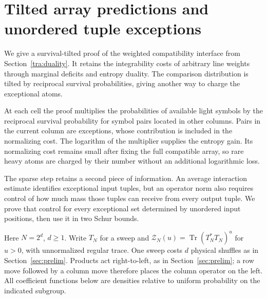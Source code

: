 \section{Tilted array predictions and unordered tuple exceptions}\label{tra:tilted-arrays}

We give a survival-tilted proof of the weighted compatibility interface
from Section~\ref{tra:duality}. It retains the integrability costs of
arbitrary line weights through marginal deficits and entropy duality.
The comparison distribution is tilted by reciprocal survival
probabilities, giving another way to charge the exceptional atoms.

At each cell the proof multiplies the probabilities of available light symbols by the reciprocal survival probability for symbol pairs located in other columns. Pairs in the current column are exceptions, whose contribution is included in the normalizing cost. The logarithm of the multiplier supplies the entropy gain. Its normalizing cost remains small after fixing the full compatible array, so rare heavy atoms are charged by their number without an additional logarithmic loss.

The sparse step retains a second piece of information. An average interaction estimate identifies exceptional input tuples, but an operator norm also requires control of how much mass those tuples can receive from every output tuple. We prove that control for every exceptional set determined by unordered input positions, then use it in two Schur bounds.

Here $N=2^d$, $d\ge1$. Write $T_N$ for a sweep and $\mathcal Z_N(u)=\operatorname{Tr}(T_N^*T_N)^u$ for $u>0$, with unnormalized regular trace. One sweep costs $d$ physical shuffles as in Section~\ref{sec:prelim}. Products act right-to-left, as in Section~\ref{sec:prelim}; a row move followed by a column move therefore places the column operator on the left. All coefficient functions below are densities relative to uniform probability on the indicated subgroup.


